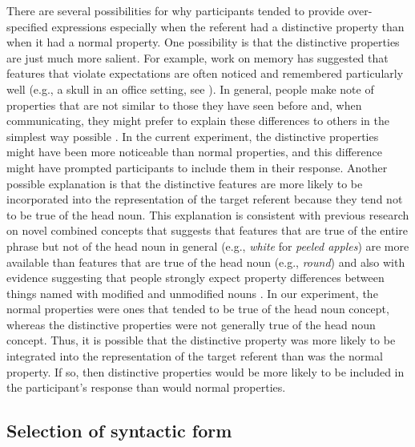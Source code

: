\documentclass[output=paper]{langsci/langscibook}
\begin{document}
There are several possibilities for why participants tended to provide
over-specified expressions especially when the referent had a
distinctive property than when it had a normal property. One
possibility is that the distinctive properties are just much more
salient. For example, work on memory has suggested that features that
violate expectations are often noticed and remembered particularly
well (e.g., a skull in an office setting, see \citealt{brewer1981role}).
In general, people make note of properties that are not similar to
those they have seen before and, when communicating, they might prefer
to explain these differences to others in the simplest way possible \citep{garrod1987saying,markman1997creation}. In the
current experiment, the distinctive properties might have been more
noticeable than normal properties, and this difference might have
prompted participants to include them in their response. Another
possible explanation is that the distinctive features are more likely
to be incorporated into the representation of the target referent
because they tend not to be true of the head noun. This explanation is
consistent with previous research on novel combined concepts that
suggests that features that are true of the entire phrase but not of
the head noun in general (e.g., \textit{white} for \textit{peeled
  apples}) are more available than features that are true of the head
noun (e.g., \textit{round}) \citep{springer1992feature,gagne1996influence} and also with evidence suggesting that people strongly expect
property differences between things named with modified and unmodified
nouns \citep{gagne2011inferential,gagne2014subcategorisation,spalding2015property}. In our experiment, the normal properties were ones that
tended to be true of the head noun concept, whereas the distinctive
properties were not generally true of the head noun concept. Thus, it
is possible that the distinctive property was more likely to be
integrated into the representation of the target referent than was the
normal property. If so, then distinctive properties would be more
likely to be included in the participant's response than would normal
properties.

\subsection{Selection of syntactic form}
\end{document}
